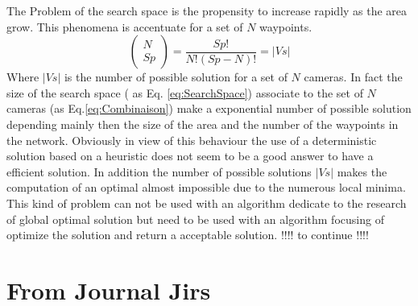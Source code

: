 The Problem of the search space is the propensity to increase rapidly as the area grow. This phenomena is accentuate for a set of $N$  waypoints.
 \begin{equation} \label{eq:Combinaison}
 \begin{pmatrix} N \\ Sp \end{pmatrix}  = \frac{Sp!}{N!(Sp-N)!} = |Vs|
 \end{equation} 
 Where $|Vs|$ is the number of possible solution for a set of $N$ cameras. %
 In fact the size of the search space ( as Eq. \ref{eq:SearchSpace}) associate to the set of $N$ cameras (as Eq.\ref{eq:Combinaison}) make a exponential number of possible solution depending mainly then the size of the area and the number of the waypoints in the network. 
 Obviously in view of this behaviour the use of a deterministic solution based on a heuristic does not seem to be a good answer to have a efficient solution. In addition the number of possible solutions $|Vs|$ makes the computation of an optimal almost impossible due to the numerous local minima. This kind of problem can not be used with an algorithm dedicate to the research of global optimal solution but need to be used with an algorithm focusing of optimize the solution and return a acceptable solution.
 !!!! to continue !!!!

\section{From Journal Jirs}
\iffalse 

